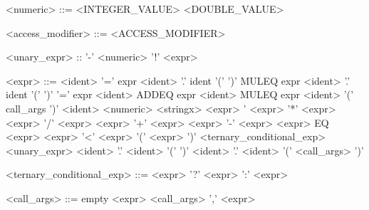\documentclass{article}
\begin{document}
\begin{grammar}
<numeric> ::= <INTEGER_VALUE>
\alt <DOUBLE_VALUE>

<access_modifier> ::= <ACCESS_MODIFIER> 

<unary_expr> ::	'-' <numeric>
\alt '!' <expr>

<expr> ::= <ident> '=' expr 
\alt <ident> '.' ident '(' ')' MULEQ expr
\alt <ident> '.' ident '(' ')' '=' expr 
\alt <ident> ADDEQ expr 
\alt <ident> MULEQ expr 
\alt <ident> '(' call_args ')'
\alt <ident> 
\alt <numeric>
\alt <stringx>
\alt <expr> '%
\alt <expr> '*' <expr> 
\alt <expr> '/' <expr> 
\alt <expr> '+' <expr> 
\alt <expr> '-' <expr> 
\alt <expr> EQ <expr>
\alt <expr> '<' <expr>
\alt '(' <expr> ')' 
\alt <ternary_conditional_exp>
\alt <unary_expr>
\alt <ident> '.' <ident> '(' ')' 
\alt <ident> '.' <ident> '(' <call_args> ')' 

<ternary_conditional_exp> ::= <expr> '?' <expr> ':' <expr>

<call_args> ::= empty
\alt <expr> 
\alt <call_args> ',' <expr>  

\end{grammar}
\end{document}
